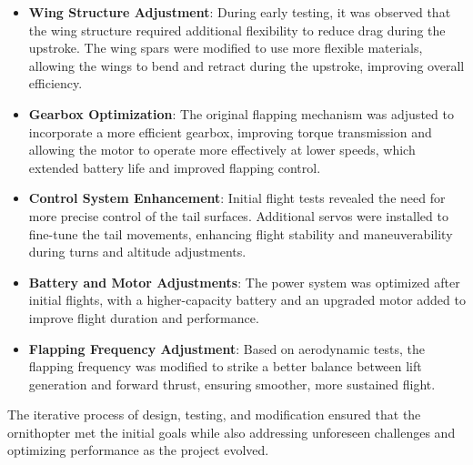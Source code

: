 \begin{itemize}
    \item \textbf{Wing Structure Adjustment}: During early testing, it was observed that the wing structure required additional flexibility to reduce drag during the upstroke. The wing spars were modified to use more flexible materials, allowing the wings to bend and retract during the upstroke, improving overall efficiency.
    
    \item \textbf{Gearbox Optimization}: The original flapping mechanism was adjusted to incorporate a more efficient gearbox, improving torque transmission and allowing the motor to operate more effectively at lower speeds, which extended battery life and improved flapping control.
    
    \item \textbf{Control System Enhancement}: Initial flight tests revealed the need for more precise control of the tail surfaces. Additional servos were installed to fine-tune the tail movements, enhancing flight stability and maneuverability during turns and altitude adjustments.
    
    \item \textbf{Battery and Motor Adjustments}: The power system was optimized after initial flights, with a higher-capacity \lipo battery and an upgraded \bldc motor added to improve flight duration and performance.
    
    \item \textbf{Flapping Frequency Adjustment}: Based on aerodynamic tests, the flapping frequency was modified to strike a better balance between lift generation and forward thrust, ensuring smoother, more sustained flight.
\end{itemize}

The iterative process of design, testing, and modification ensured that the ornithopter met the initial goals while also addressing unforeseen challenges and optimizing performance as the project evolved.